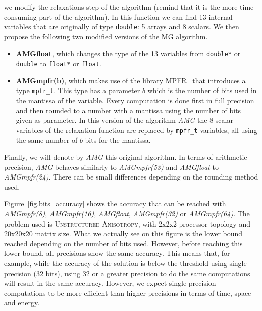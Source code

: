  we modify the
relaxations step of the algorithm (remind that it is the more time consuming
part of the algorithm). In this function we can find 13 internal variables that
are originally of type \texttt{double}: 5 arrays and 8 scalars. We then propose
the following two modified versions of the MG algorithm.

\begin{itemize}

    \item \textbf{AMGfloat}, which changes the type of the 13 variables from
        \texttt{double*} or \texttt{double} to \texttt{float*} or
        \texttt{float}.

    \item \textbf{AMGmpfr(b)}, which makes use of the library
        MPFR~\cite{MPFR,MPFR_link} that introduces a type \texttt{mpfr\_t}.
        This type has a parameter $b$ which is the number of bits used in the
        mantissa of the variable. Every computation is done first in full
        precision and then rounded to a number with a mantissa using the number
        of bits given as parameter. In this version of the algorithm \emph{AMG}
        the 8 scalar variables of the relaxation function are replaced by
        \texttt{mpfr\_t} variables, all using the same number of $b$ bits for
        the mantissa.

\end{itemize}

Finally, we will denote by \emph{AMG} this original algorithm.  In terms of
arithmetic precision, \emph{AMG} behaves similarly to \emph{AMGmpfr(53)} and
\emph{AMGfloat} to \emph{AMGmpfr(24)}. There can be small differences depending
on the rounding method used.

Figure~\ref{fig.bits_accuracy} shows the accuracy that can be reached with
\emph{AMGmpfr(8)}, \emph{AMGmpfr(16)}, \emph{AMGfloat}, \emph{AMGmpfr(32)} or
\emph{AMGmpfr(64)}. The problem used is \textsc{Unstructured-Anisotropy}, with
2x2x2 processor topology and 20x20x20 matrix size. What we actually see on this
figure is the lower bound reached depending on the number of bits used.
However, before reaching this lower bound, all precisions show the same
accuracy. This means that, for example, while the accuracy of the solution is
below the threshold using single precision (32 bits), using 32 or a greater
precision to do the same computations will result in the same accuracy.
However, we expect single precision computations to be more efficient than
higher precisions in terms of time, space and energy.

